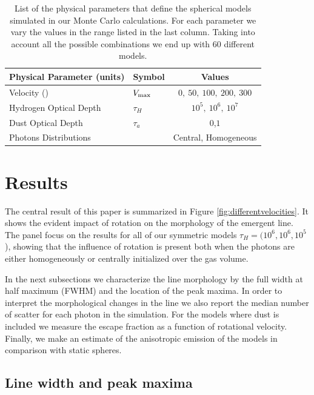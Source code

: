 \documentclass{emulateapj}
\newcommand{\ly}{{\ifmmode{{\rm Ly}\alpha~}\else{Ly$\alpha$~}\fi}}
\newcommand{\kms}{{\ifmmode{{\mathrm{\,km\ s}^{-1}}}\else{\,km~s$^{-1}$}\fi}}
\begin{document}
\begin{table}
\begin{center}
\begin{tabular}{llc}\hline\hline
Physical Parameter (units) & Symbol & Values\\\hline
Velocity (\kms) & $V_{\rm max}$&$0,\ 50,\ 100,\ 200,\ 300$\\
Hydrogen Optical Depth & $\tau_{H} $ & $10^{5},\ 10^{6},\ 10^{7}$\\
Dust Optical Depth & $\tau_{a}$ & $0$,$1$\\
Photons Distributions & & Central, Homogeneous\\\hline\hline
\end{tabular}
\caption{
  List of the physical parameters that define the spherical models 
  simulated in our Monte Carlo calculations. For each parameter we
  vary the values in the range listed in the last column. Taking into
  account all the possible combinations we end up with $60$ different
  models.} 
\label{table:models}
\end{center}
\end{table}


\section{Results}
\label{sec:results}

The central result of this paper is summarized in Figure
\ref{fig:differentvelocities}. It shows the evident
impact of rotation on the morphology of the emergent \ly line.
The panel focus on the results for all of our symmetric models
 $\tau_{H}=(10^{6}, 10^{6}, 10^{5}$), showing that the
influence of rotation is present both when the photons are either
homogeneously or centrally initialized over the gas volume.  

In the next subsections we characterize the line morphology by the
full width at half maximum (FWHM) and the location of the peak
maxima. In order to interpret the morphological changes in the line we
also report the median number of scatter for each \ly photon in the
simulation. For the models where dust is included we measure the 
escape fraction as a function of rotational velocity. Finally, we make
an estimate of the anisotropic emission of the models in comparison
with static spheres.


\subsection{Line width and peak maxima}
\label{sec:widthpeak}
\end{document}
